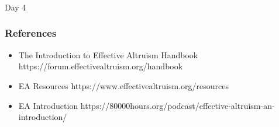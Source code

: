 \begin{frame}[fragile]\frametitle{}
\begin{center}
{\Large Day 4}
\end{center}
\end{frame}

\begin{frame}[fragile]\frametitle{References}
  \begin{itemize}
    \item The Introduction to Effective Altruism Handbook https://forum.effectivealtruism.org/handbook
	\item EA Resources https://www.effectivealtruism.org/resources
	\item EA Introduction https://80000hours.org/podcast/effective-altruism-an-introduction/
  \end{itemize}

\end{frame}